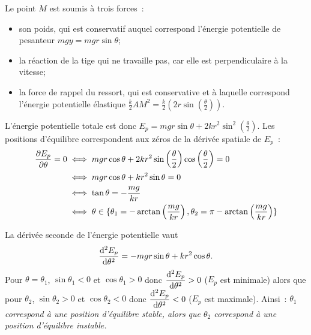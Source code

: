 Le point $M$ est soumis à trois forces~:
\begin{itemize}
\item son poids, qui est conservatif auquel correspond l'énergie potentielle de pesanteur $mgy=mgr\sin\theta$;
\item la réaction de la tige qui ne travaille pas, car elle est perpendiculaire à la vitesse;
\item la force de rappel du ressort, qui est conservative et à laquelle correspond l'énergie potentielle élastique $\frac{k}{2}AM^2=\frac{k}{2}\left(2r\sin\left(\frac{\theta}{2}\right)\right)$.
\end{itemize}

L'énergie potentielle totale est donc $E_p = mgr \sin\theta + 2kr^2 \sin^2\left(\frac{\theta}{2}\right)$. Les positions d'équilibre correspondent aux zéros de la dérivée spatiale de $E_p$~:
\begin{align}
  \dfrac{\partial E_p}{\partial \theta} = 0 &\iff mgr\cos\theta +2kr^2 \sin\left(\frac{\theta}{2}\right) \cos\left(\frac{\theta}{2}\right)=0 \\
  & \iff mgr\cos\theta + kr^2 \sin\theta=0 \\
  & \iff \tan\theta = -\frac{mg}{kr} \\
  & \iff \theta \in \{\theta_1=-\arctan \left( \frac{mg}{kr} \right), \theta_2=\pi-\arctan \left( \frac{mg}{kr} \right)\}
\end{align}

La dérivée seconde de l'énergie potentielle vaut
\begin{equation}
  \dfrac{\mathrm{d}^2 E_p}{\mathrm{d} {\theta}^2} = -mgr\sin\theta +kr^2\cos\theta.
\end{equation}
Pour $\theta=\theta_1$, $\sin\theta_1<0$ et $\cos\theta_1>0$ donc $\dfrac{\mathrm{d}^2 E_p}{\mathrm{d} {\theta}^2}>0$ ($E_p$ est minimale) alors que pour $\theta_2$, $\sin\theta_2>0$ et $\cos\theta_2<0$ donc $\dfrac{\mathrm{d}^2 E_p}{\mathrm{d} {\theta}^2}<0$ ($E_p$ est maximale). Ainsi~: \emph{$\theta_1$ correspond à une position d'équilibre stable, alors que $\theta_2$ correspond à une position d'équilibre instable.}
